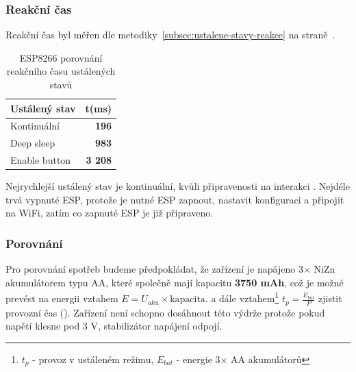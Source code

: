 \documentclass[a4paper, 12pt]{report}
\begin{document}
    \subsubsection{Reakční čas}
    Reakční čas byl měřen dle metodiky~\ref{subsec:ustalene-stavy-reakce} na straně~\pageref{subsec:ustalene-stavy-reakce}.
    \begin{table}[]
        \centering
        \caption{ESP8266 porovnání reakčního času ustálených stavů}
        \begin{tabular}{||l|r||}
            \hline
            Ustálený stav & t(ms)          \\
            \hline
            Kontinuální   & \textbf{196}   \\
            Deep sleep    & \textbf{983}   \\
            Enable button & \textbf{3 208} \\
            \hline
        \end{tabular}
        \label{tab:esp8266-klidove-rezimy-cas}
    \end{table}
    Nejrychlejší ustálený stav je kontinuální, kvůli připravenosti na interakci .
    Nejdéle trvá vypnuté ESP, protože je nutné ESP zapnout, nastavit konfiguraci a připojit na WiFi, zatím co zapnuté ESP je již připraveno.

    \subsubsection{Porovnání}
    Pro porovnání spotřeb budeme předpokládat, že zařízení je napájeno 3$\times$ NiZn akumulátorem typu AA, které společně mají kapacitu \textbf{3750 mAh}, což je možné prevést na energii vztahem $E = U_{aku}\times \textrm{kapacita}$.
    a dále vztahem\footnote{$ t_{p}$ - provoz v ustáleném režimu, $ E_{bat}$ - energie 3$\times$ AA akumulátorů} $ t_{p} = \frac{E_{bat}}{P}$ zjistit provozní čas ().
    Zařízení není schopno dosáhnout této výdrže protože pokud napětí klesne pod 3 V, stabilizátor napájení odpojí.
\end{document}
